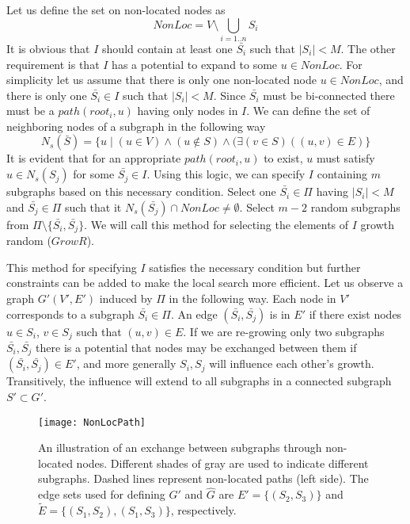 Let us define the set on non-located nodes as
\begin{equation} 
NonLoc = V  \setminus \bigcup\limits_{i=1..n} S_i 
\end{equation} 
It is obvious that $I$ should contain at least one $\bar{S_i}$ such that $|S_i| < M$. The other requirement is that $I$ has a potential to expand to some $u \in NonLoc$. For simplicity let us assume that there is only one non-located node $u \in NonLoc$, and there is only one $\bar{S_i} \in I$ such that $|S_i|<M$. Since $\bar{S_i}$ must be bi-connected there must be a $path(root_i,u)$ having only nodes in $I$. We can define the set of neighboring nodes of a subgraph in the following way
\begin{equation} 
N_s(\bar{S}) = \{u \mid (u \in V)\wedge (u \notin S) \wedge (\exists(v \in S)((u,v) \in E) \} 
\end{equation} 
It is evident that for an appropriate $path(root_i, u)$ to exist, $u$ must satisfy $u \in N_s(S_j)$ for some $\bar{S_j} \in I$. Using this logic, we can specify $I$ containing $m$ subgraphs based on this necessary condition. Select one $\bar{S_i} \in \Pi$ having $|S_i|<M$ and $\bar{S_j} \in \Pi$ such that it  $N_s(\bar{S_j}) \cap NonLoc \neq \emptyset $. Select $m - 2$ random subgraphs from $\Pi \setminus \{ \bar{S_i}, \bar{S_j} \}$. We will call this method for selecting the elements of $I$ growth random ($GrowR$).

This method for specifying $I$ satisfies the necessary condition but further constraints can be added to make the local search more efficient. Let us observe a graph $G'(V',E')$ induced by $\Pi$ in the following way.  Each node in $V'$  corresponds to a subgraph $\bar{S_i} \in \Pi$. An edge $(\bar{S_i},\bar{S_j})$ is in $E'$  if there exist nodes $u \in S_i$, $v \in S_j$ such that $(u,v) \in E$. If we are re-growing only two subgraphs $\bar{S_i}, \bar{S_j}$ there is a potential that nodes may be exchanged between  them  if $(\bar{S_i}, \bar{S_j}) \in E'$, and more generally $S_i, S_j$ will influence each other's growth. Transitively, the influence will extend to all subgraphs in a connected subgraph $S' \subset G'$.

\begin{figure}[tcb]
\centering
\texttt{[image: NonLocPath]}
\caption{An illustration of an exchange between subgraphs through non-located nodes. Different shades of gray are used to indicate different subgraphs. Dashed lines represent non-located paths (left side). The edge sets used for defining  $G'$ and $\hat{G}$  are $E' = \{(S_2, S_3)\}$ and $\tilde{E} = \{(S_1, S_2), (S_1, S_3)\}$, respectively. }
\label{fig:NonLocPath}
\end{figure} 

